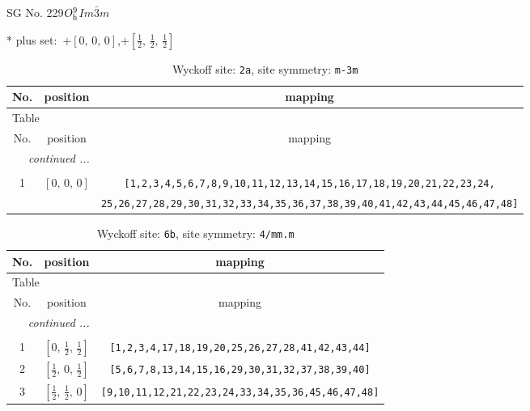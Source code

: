 \documentclass[fleqn,8pt]{jsarticle}
\begin{document}
\setcounter{MaxMatrixCols}{32}

\renewcommand{\tablename}{Table~}
\renewcommand{\figurename}{Figure~}
\begin{center}
\LARGE
SG No. 229\quad$O_{\rm h}^{9}$\quad$Im\bar{3}m$\quad[ cubic ]
\end{center}
* plus set:\,\,\,$+\left[ 0,\, 0,\, 0 \right]$,\quad $+\left[ \frac{1}{2},\, \frac{1}{2},\, \frac{1}{2} \right]$
\renewcommand{\arraystretch}{1.2}
\begin{longtable}{ccc}
\caption{Wyckoff site: {\tt 2a}, site symmetry: {\tt m-3m}}
 \\
 \hline \hline
No. & position & mapping \\ \hline \endfirsthead

\multicolumn{2}{l}{\tablename\ \thetable{}} \\
 \hline \hline
No. & position & mapping \\ \hline \endhead

 \hline \hline
\multicolumn{2}{r}{\footnotesize\it continued ...} \\ \endfoot

 \hline \hline
\multicolumn{2}{r}{} \\ \endlastfoot

1 & $\left[ 0,\, 0,\, 0 \right]$ & {\tt [1,2,3,4,5,6,7,8,9,10,11,12,13,14,15,16,17,18,19,20,21,22,23,24,} \\ \hline
 &  & {\tt 25,26,27,28,29,30,31,32,33,34,35,36,37,38,39,40,41,42,43,44,45,46,47,48]} \\
\end{longtable}
\renewcommand{\arraystretch}{1.2}
\begin{longtable}{ccc}
\caption{Wyckoff site: {\tt 6b}, site symmetry: {\tt 4/mm.m}}
 \\
 \hline \hline
No. & position & mapping \\ \hline \endfirsthead

\multicolumn{2}{l}{\tablename\ \thetable{}} \\
 \hline \hline
No. & position & mapping \\ \hline \endhead

 \hline \hline
\multicolumn{2}{r}{\footnotesize\it continued ...} \\ \endfoot

 \hline \hline
\multicolumn{2}{r}{} \\ \endlastfoot

1 & $\left[ 0,\, \frac{1}{2},\, \frac{1}{2} \right]$ & {\tt [1,2,3,4,17,18,19,20,25,26,27,28,41,42,43,44]} \\ \hline
2 & $\left[ \frac{1}{2},\, 0,\, \frac{1}{2} \right]$ & {\tt [5,6,7,8,13,14,15,16,29,30,31,32,37,38,39,40]} \\ \hline
3 & $\left[ \frac{1}{2},\, \frac{1}{2},\, 0 \right]$ & {\tt [9,10,11,12,21,22,23,24,33,34,35,36,45,46,47,48]} \\
\end{longtable}
\end{document}
